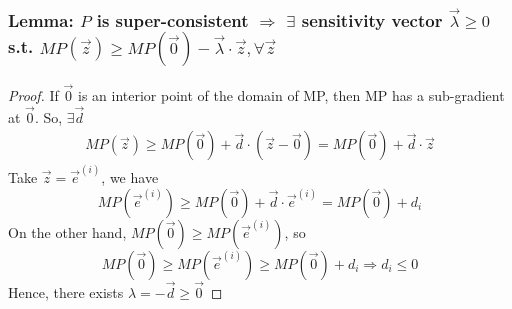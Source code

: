 \documentclass[11pt,a4paper]{article}
\newtheorem{lemma}{Lemma}
\begin{document}
\subsubsection{Lemma: $P$ is super-consistent $\Rightarrow$ $\exists$ sensitivity vector $\vec{\lambda}\geq 0$ s.t. $MP(\vec{z})\geq MP(\vec{0})-\vec{\lambda}\cdot \vec{z},\forall \vec{z}$}
\begin{center}
\end{center}
\begin{proof}
    If $\vec{0}$ is an interior point of the domain of MP, then MP has a sub-gradient at $\vec{0}$. So, $\exists \vec{d}$
    \begin{equation}
        \begin{aligned}
            MP(\vec{z})\geq MP(\vec{0})+\vec{d}\cdot(\vec{z}-\vec{0})=MP(\vec{0})+\vec{d}\cdot\vec{z}
        \end{aligned}
        \nonumber
    \end{equation}
    Take $\vec{z}=\vec{e}^{(i)}$, we have $$MP(\vec{e}^{(i)})\geq MP(\vec{0})+\vec{d}\cdot \vec{e}^{(i)}=MP(\vec{0})+d_i$$
    On the other hand, $MP(\vec{0})\geq MP(\vec{e}^{(i)})$, so $$MP(\vec{0})\geq MP(\vec{e}^{(i)})\geq MP(\vec{0})+d_i \Rightarrow d_i\leq 0$$
    Hence, there exists $\lambda=-\vec{d}\geq \vec{0}$
\end{proof}
\end{document}
